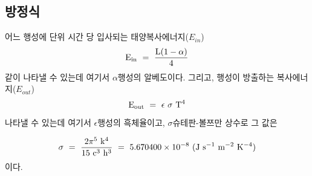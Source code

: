 \subsection{방정식}\index{}


어느 행성에 단위 시간 당 입사되는 태양복사에너지($E_{in}$)\는 
\begin{equation}
{\rm E_{in} ~ = ~ \frac{L (1- \alpha)} {4}}
\label{eq:001}
\end{equation}
\와 같이 나타낼 수 있는데 여기서 ${\alpha}$\는 행성의 알베도이다. 그리고, 행성이 방출하는 복사에너지($E_{out}$)\는 
\begin{equation}
{\rm E_{out} ~ = ~ {\epsilon} ~ {\sigma} ~ T^4}
\label{eq:002}
\end{equation}
\로 나타낼 수 있는데 여기서 ${\epsilon}$\은 행성의 흑체율이고, ${\sigma}$\는 슈테판-볼쯔만 상수로 그 값은

\begin{equation}%
{\rm \sigma ~ =~ \frac{2\pi^5~k^4}{15~c^3~h^3}~=~ 5.670400 \times 10^{-8}~ (J ~s^{-1}~m^{-2}~K^{-4})}
\end{equation}
이다. 


